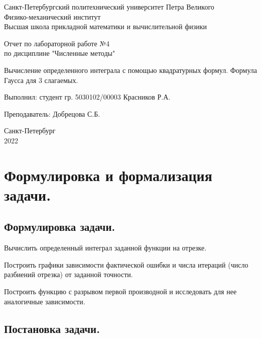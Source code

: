 \documentclass[a4paper, 12pt]{article}
\begin{document}
	\begin{titlepage}
		\begin{center}
			Санкт-Петербургский политехнический университет Петра Великого \\ Физико-механический институт \\ Высшая школа прикладной математики и вычислительной физики
		\end{center}
		\vspace{10em}
		\begin{center}
			\Large Отчет по лабораторной работе №4 \\ по дисциплине "Численные методы"
		\end{center}
		\vspace{1em}
		\begin{center}
			\Huge Вычисление определенного интеграла с помощью квадратурных формул. Формула Гаусса для 3 слагаемых.
		\end{center}
		\vspace{15em}
		{\Large 
			
			Выполнил: студент гр. 5030102/00003 Красников Р.А.
			\vspace{1em}
			
			Преподаватель: Добрецова С.Б.}
		\vspace{\fill}
		\begin{center}
			Санкт-Петербург \\ 2022
		\end{center}
	\end{titlepage}
	\newpage
	
	\section{Формулировка и формализация задачи.}
	
	\subsection{Формулировка задачи.}
	
	Вычислить определенный интеграл заданной функции на отрезке.
	
	Построить графики зависимости фактической ошибки и числа итераций (число разбиений отрезка) от заданной точности.
	
	Построить функцию с разрывом первой производной и исследовать для нее аналогичные зависимости.
	
	\subsection{Постановка задачи.}
	
\end{document}
